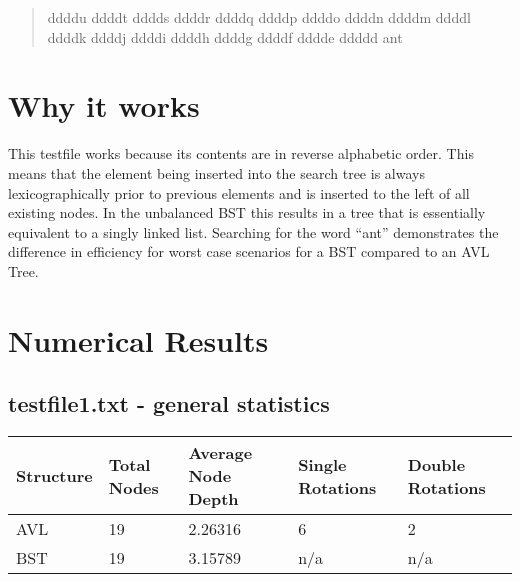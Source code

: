 \documentclass{article} %
\begin{document}
\begin{quote}
ddddu ddddt dddds ddddr ddddq ddddp ddddo ddddn ddddm ddddl ddddk ddddj ddddi ddddh ddddg ddddf dddde ddddd ant
\end{quote}

\section{Why it works}
This testfile works because its contents are in reverse alphabetic order. This means that the element being inserted into the search tree is always lexicographically prior to previous elements and is inserted to the left of all existing nodes. In the unbalanced BST this results in a tree that is essentially equivalent to a singly linked list. Searching for the word ``ant'' demonstrates the difference in efficiency for worst case scenarios for a BST compared to an AVL Tree.

\section{Numerical Results}
\subsection*{testfile1.txt - general statistics}
\begin{tabular}{|l|l|l|l|l|}
\hline
Structure & Total Nodes & Average Node Depth & Single Rotations & Double Rotations \\ \hline
AVL       & 19          & 2.26316            & 6                & 2                \\ \hline
BST       & 19          & 3.15789            & n/a              & n/a              \\ \hline
\end{tabular}
\end{document}
